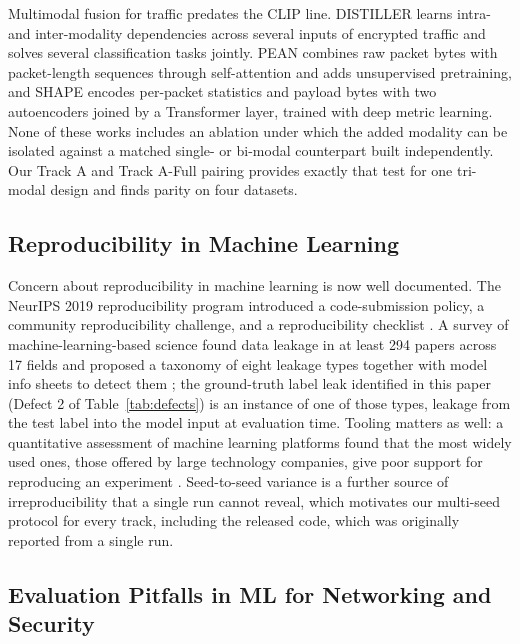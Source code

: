 \documentclass[journal]{IEEEtran}
\begin{document}
Multimodal fusion for traffic predates the CLIP line. DISTILLER \cite{distiller2021} learns intra- and inter-modality dependencies across several inputs of encrypted traffic and solves several classification tasks jointly. PEAN \cite{lin2023pean} combines raw packet bytes with packet-length sequences through self-attention and adds unsupervised pretraining, and SHAPE \cite{shape2023} encodes per-packet statistics and payload bytes with two autoencoders joined by a Transformer layer, trained with deep metric learning. None of these works includes an ablation under which the added modality can be isolated against a matched single- or bi-modal counterpart built independently. Our Track A and Track A-Full pairing provides exactly that test for one tri-modal design and finds parity on four datasets.

\subsection{Reproducibility in Machine Learning}

Concern about reproducibility in machine learning is now well documented. The NeurIPS 2019 reproducibility program introduced a code-submission policy, a community reproducibility challenge, and a reproducibility checklist \cite{pineau2021}. A survey of machine-learning-based science found data leakage in at least 294 papers across 17 fields and proposed a taxonomy of eight leakage types together with model info sheets to detect them \cite{kapoor2023}; the ground-truth label leak identified in this paper (Defect 2 of Table~\ref{tab:defects}) is an instance of one of those types, leakage from the test label into the model input at evaluation time. Tooling matters as well: a quantitative assessment of machine learning platforms found that the most widely used ones, those offered by large technology companies, give poor support for reproducing an experiment \cite{gundersen2022}. Seed-to-seed variance is a further source of irreproducibility that a single run cannot reveal, which motivates our multi-seed protocol for every track, including the released code, which was originally reported from a single run.

\subsection{Evaluation Pitfalls in ML for Networking and Security}
\end{document}
